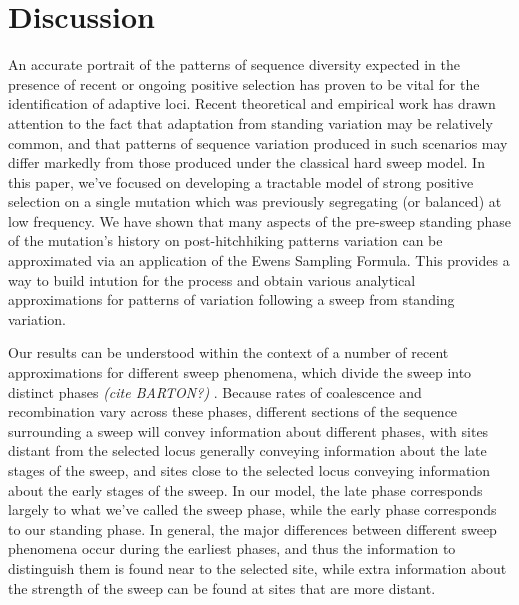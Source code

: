 \documentclass[a4paper,10pt]{article}
\newcommand{\gc}[1]{{\it \color{red} (#1)} }
\newcommand{\jb}[1]{{\it\color{blue} (#1)} }
\begin{document}
%
%
%
%
%

\section{Discussion}

An accurate portrait of the patterns of sequence diversity expected in the presence of recent or ongoing positive selection has proven to be vital for the identification of adaptive loci. Recent theoretical and empirical work has drawn attention to the fact that adaptation from standing variation may be relatively common, and that patterns of sequence variation produced in such scenarios may differ markedly from those produced under the classical hard sweep model. In this paper, we've focused on developing a tractable model of strong positive selection on a single mutation which was previously segregating (or balanced) at low frequency. We have shown that many aspects of the pre-sweep standing phase of the mutation's history on post-hitchhiking patterns variation can be approximated via an application of the Ewens Sampling Formula. This provides a way to build intution for the process and obtain various analytical approximations for patterns of variation following a sweep from standing variation. 

Our results can be understood within the context of a number of recent approximations for different sweep phenomena, which divide the sweep into distinct phases \jb{cite BARTON?}. Because rates of coalescence and recombination vary across these phases, different sections of the sequence surrounding a sweep will convey information about different phases, with sites distant from the selected locus generally conveying information about the late stages of the sweep, and sites close to the selected locus conveying information about the early stages of the sweep. In our model, the late phase corresponds largely to what we've called the sweep phase, while the early phase corresponds to our standing phase. In general, the major differences between different sweep phenomena occur during the earliest phases, and thus the information to distinguish them is found near to the selected site, while extra information about the strength of the sweep can be found at sites that are more distant.
\end{document}
